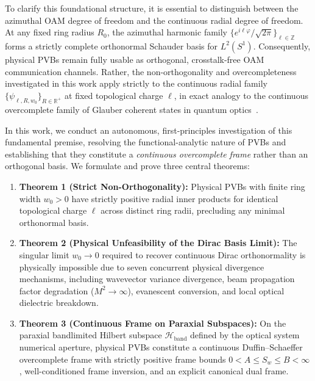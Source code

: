 \documentclass[11pt,a4paper]{article}
\begin{document}
To clarify this foundational structure, it is essential to distinguish between the azimuthal OAM degree of freedom and the continuous radial degree of freedom. At any fixed ring radius $R_0$, the azimuthal harmonic family $\{e^{i\ell\varphi}/\sqrt{2\pi}\}_{\ell \in \mathbb{Z}}$ forms a strictly complete orthonormal Schauder basis for $L^2(S^1)$. Consequently, physical PVBs remain fully usable as orthogonal, crosstalk-free OAM communication channels. Rather, the non-orthogonality and overcompleteness investigated in this work apply strictly to the continuous radial family $\{\psi_{\ell, R, w_0}\}_{R \in \mathbb{R}^+}$ at fixed topological charge $\ell$, in exact analogy to the continuous overcomplete family of Glauber coherent states in quantum optics~\cite{Klauder1985,Perelomov1986}.

In this work, we conduct an autonomous, first-principles investigation of this fundamental premise, resolving the functional-analytic nature of PVBs and establishing that they constitute a \emph{continuous overcomplete frame} rather than an orthogonal basis. We formulate and prove three central theorems:
\begin{enumerate}
    \item \textbf{Theorem 1 (Strict Non-Orthogonality):} Physical PVBs with finite ring width $w_0 > 0$ have strictly positive radial inner products for identical topological charge $\ell$ across distinct ring radii, precluding any minimal orthonormal basis.
    \item \textbf{Theorem 2 (Physical Unfeasibility of the Dirac Basis Limit):} The singular limit $w_0 \to 0$ required to recover continuous Dirac orthonormality is physically impossible due to seven concurrent physical divergence mechanisms, including wavevector variance divergence, beam propagation factor degradation ($M^2 \to \infty$), evanescent conversion, and local optical dielectric breakdown.
    \item \textbf{Theorem 3 (Continuous Frame on Paraxial Subspaces):} On the paraxial bandlimited Hilbert subspace $\mathcal{H}_{\text{band}}$ defined by the optical system numerical aperture, physical PVBs constitute a continuous Duffin--Schaeffer overcomplete frame with strictly positive frame bounds $0 < A \le S_w \le B < \infty$, well-conditioned frame inversion, and an explicit canonical dual frame.
\end{enumerate}
\end{document}
